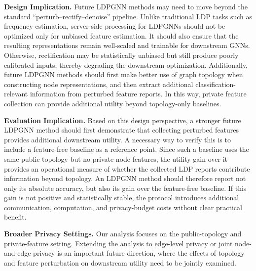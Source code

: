 \documentclass[conference,compsoc]{IEEEtran}
\theoremstyle{boldplain}
\theoremstyle{bolddefinition}
\theoremstyle{remark}
\newcommand{\mypara}[1]{\noindent\textbf{#1.}\xspace}
\newcommand{\ldpgnn}{LDPGNN\xspace}
\newcommand{\ldpgnns}{LDPGNNs\xspace}
\begin{document}
\mypara{Design Implication}
Future \ldpgnn methods may need to move beyond the standard ``perturb--rectify--denoise'' pipeline.
Unlike traditional LDP tasks such as frequency estimation, server-side processing for \ldpgnns should not be optimized only for unbiased feature estimation.
It should also ensure that the resulting representations remain well-scaled and trainable for downstream GNNs.
Otherwise, rectification may be statistically unbiased but still produce poorly calibrated inputs, thereby degrading the downstream optimization.
Additionally, future \ldpgnn methods should first make better use of graph topology when constructing node representations, and then extract additional classification-relevant information from perturbed feature reports. In this way, private feature collection can provide additional utility beyond topology-only baselines.

\vspace{0.1cm}

\mypara{Evaluation Implication}
Based on this design perspective, a stronger future \ldpgnn method should first demonstrate that collecting perturbed features provides additional downstream utility.
A necessary way to verify this is to include a feature-free baseline as a reference point.
Since such a baseline uses the same public topology but no private node features, the utility gain over it provides an operational measure of whether the collected LDP reports contribute information beyond topology.
An \ldpgnn method should therefore report not only its absolute accuracy, but also its gain over the feature-free baseline.
If this gain is not positive and statistically stable, the protocol introduces additional communication, computation, and privacy-budget costs without clear practical benefit.

\noindent
\textcolor{purple!80}{\mypara{Broader Privacy Settings}
Our analysis focuses on the public-topology and private-feature setting.
Extending the analysis to edge-level privacy or joint node-and-edge privacy is an important future direction, where the effects of topology and feature perturbation on downstream utility need to be jointly examined.
}
\end{document}
